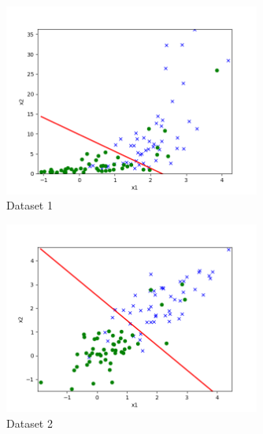 \begin{answer}
    \begin{figure}[H]
        \centering
        \includegraphics[width=0.75\textwidth]{../src/linearclass/logreg_pred_1.png}
        \caption{Dataset 1}
        \label{fig:linearclass-logreg-pred-1}
    \end{figure}
    \begin{figure}[H]
        \centering
        \includegraphics[width=0.75\textwidth]{../src/linearclass/logreg_pred_2.png}
        \caption{Dataset 2}
        \label{fig:linearclass-logreg-pred-2}
    \end{figure}
\end{answer}
